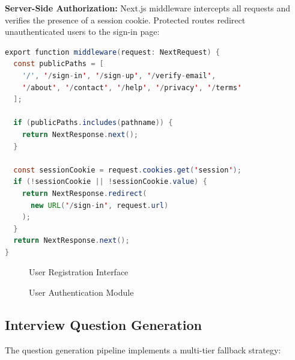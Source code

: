 \documentclass[12pt,a4paper,oneside]{report}
\begin{document}
\textbf{Server-Side Authorization:} Next.js middleware intercepts all requests and verifies the presence of a session cookie. Protected routes redirect unauthenticated users to the sign-in page:

\begin{lstlisting}[language=Java, caption={Route Protection Middleware}, label={lst:middleware}]
export function middleware(request: NextRequest) {
  const publicPaths = [
    '/', '/sign-in', '/sign-up', '/verify-email',
    '/about', '/contact', '/help', '/privacy', '/terms'
  ];

  if (publicPaths.includes(pathname)) {
    return NextResponse.next();
  }

  const sessionCookie = request.cookies.get('session');
  if (!sessionCookie || !sessionCookie.value) {
    return NextResponse.redirect(
      new URL('/sign-in', request.url)
    );
  }
  return NextResponse.next();
}
\end{lstlisting}

\begin{figure}[H]
\centering
{}
\caption{User Registration Interface}
\label{fig:registration}
\end{figure}

\begin{figure}[H]
\centering
{}
\caption{User Authentication Module}
\label{fig:login}
\end{figure}


\subsection{Interview Question Generation}

The question generation pipeline implements a multi-tier fallback strategy:
\end{document}
